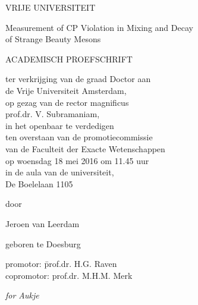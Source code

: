 \begin{center}


VRIJE UNIVERSITEIT


{\Large
Measurement of CP Violation in Mixing and Decay\\
of Strange Beauty Mesons}


ACADEMISCH PROEFSCHRIFT


ter verkrijging van de graad Doctor aan\\
de Vrije Universiteit Amsterdam,\\
op gezag van de rector magnificus\\
prof.dr. V. Subramaniam,\\
in het openbaar te verdedigen\\
ten overstaan van de promotiecommissie\\
van de Faculteit der Exacte Wetenschappen\\
op woensdag 18 mei 2016 om 11.45 uur\\
in de aula van de universiteit,\\
De Boelelaan 1105


door


Jeroen van Leerdam


geboren te Doesburg


\end{center}

\newpage
\thispagestyle{empty}

\begin{tabbing}
  promotor:    \hspace{30pt}\=  prof.dr. H.G. Raven  \\
  copromotor:               \>  prof.dr. M.H.M. Merk
\end{tabbing}

\newpage
\thispagestyle{empty}


\begin{center}
  \large
  \emph{for Aukje}
\end{center}


\newpage
\thispagestyle{empty}

\cleardoublepage
